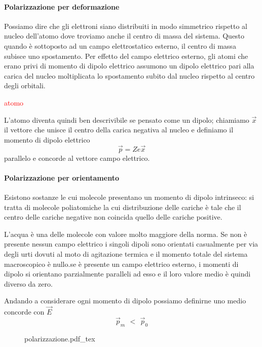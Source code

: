\documentclass[x11names]{report}
\newcommand{\incfig}[1]{%
	{#1.pdf_tex}
}
\begin{document}
\paragraph*{Polarizzazione per deformazione}
Possiamo dire che gli elettroni siano distribuiti in modo simmetrico rispetto al nucleo dell'atomo dove troviamo anche il centro di massa del sistema. Questo quando è sottoposto ad un campo elettrostatico esterno, il centro di massa subisce uno spostamento. Per effetto del campo elettrico esterno, gli atomi che erano privi di momento di dipolo elettrico assumono un dipolo elettrico pari alla carica del nucleo moltiplicata lo spostamento subito dal nucleo rispetto al centro degli orbitali.

\begin{center}
	\textcolor{red}{atomo}
\end{center}

L'atomo diventa quindi ben descrivibile se pensato come un dipolo; chiamiamo \(\vec{x}\) il vettore che unisce il centro della carica negativa al nucleo e definiamo il momento di dipolo elettrico
\[
\vec{p} = Z e \vec{x}
\]
parallelo e concorde al vettore campo elettrico.

\paragraph*{Polarizzazione per orientamento} \label{orient}
Esistono sostanze le cui molecole presentano un momento di dipolo intrinseco: si tratta di molecole poliatomiche la cui distribuzione delle cariche è tale che il centro delle cariche negative non coincida quello delle cariche positive. 

L'acqua è una delle molecole con valore molto maggiore della norma. Se non è presente nessun campo elettrico i singoli dipoli sono orientati casualmente per via degli urti dovuti al moto di agitazione termica e il momento totale del sistema macroscopico è nullo.se è presente un campo elettrico esterno, i momenti di dipolo si orientano parzialmente paralleli ad esso e il loro valore medio è quindi diverso da zero.

Andando a considerare ogni momento di dipolo possiamo definirne uno medio concorde con \(\vec{E}\)
\[
\vec{p}_m \,\ < \,\ \vec{p}_0
\]

\begin{figure}[H]
	\centering
	\incfig{polarizzazione}
\end{figure}
 
\end{document}

